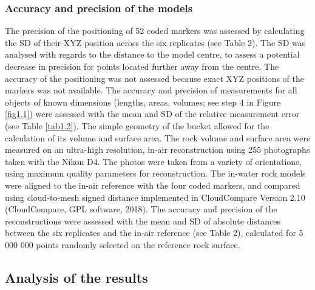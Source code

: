 \subsubsection{Accuracy and precision of the models}\label{chapitre1_2.3.3}
The precision of the positioning of 52 coded markers was assessed by calculating the SD of their XYZ position across the six replicates (see Table 2). The SD was analysed with regards to the distance to the model centre, to assess a potential decrease in precision for points located further away from the centre. The accuracy of the positioning was not assessed because exact XYZ positions of the markers was not available.
\medskip
The accuracy and precision of measurements for all objects of known dimensions (lengths, areas, volumes; see step 4 in Figure \ref{fig1.1}) were assessed with the mean and SD of the relative measurement error (see Table \ref{tab1.2}). The simple geometry of the bucket allowed for the calculation of its volume and surface area. The rock volume and surface area were measured on an ultra-high resolution, in-air reconstruction \citep{bryson_characterization_2017} using 255 photographs taken with the Nikon D4. The photos were taken from a variety of orientations, using maximum quality parameters for reconstruction. The in-water rock models were aligned to the in-air reference with the four coded markers, and compared using cloud-to-mesh signed distance implemented in CloudCompare Version 2.10 (CloudCompare, GPL software, 2018). The accuracy and precision of the reconstructions were assessed with the mean and SD of absolute distances between the six replicates and the in-air reference (see Table 2), calculated for 5 000 000 points randomly selected on the reference rock surface.

\subsection{Analysis of the results}\label{chapitre1_2.4}

